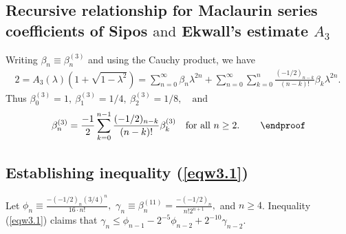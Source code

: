 \documentclass[final,oneeqnum]{siamltex}
\begin{document}
\subsection{Recursive relationship for  Maclaurin series
coefficients of Sipos $\mbox{and}$ Ekwall's estimate \protect\boldmath$A_{3}$}
Writing $\beta_{n}\equiv \beta^{(3)}_{n} $ and using the Cauchy product, we
have
\begin{eqnarray}
2=A_{3}(\lambda)(1+\sqrt{1-\lambda^2})=\sum_{n=0}^{\infty}\beta_{n}\lambda^{
2n} +
\sum_{n=0}^{\infty}\sum_{k=0}^{n}\frac{(-1/2)_{n-k}}{(n-k)!}\beta_{k}\lambda
^{2n}.\ \nonumber
\end{eqnarray} 
Thus $\beta^{(3)}_{0}=1, \ \beta^{(3)}_{1}=1/4, \
\beta^{(3)}_{2}=1/8, \quad \mbox{and} $
\begin{eqnarray}
\beta^{(3)}_{n} =
\frac{-1}{2}\sum_{k=0}^{n-1}\frac{(-1/2)_{n-k}}{(n-k)!}\beta^{(3)}_{k}
\quad
 \mbox{for all } n\geq 2.\, \nonumber \qquad\endproof%
\end{eqnarray}

\subsection{Establishing inequality (\ref{eqw3.1})} Let
$\phi_{n} \equiv  \frac{-(-1/2)_{n}(3/4)^n}{16\cdot n!},$
$\gamma_{n} \equiv  \beta^{(11)}_{n} =
\frac{-(-1/2)_{n}}{n!2^{n+1}},$ and  $n\geq 4$.
Inequality (\ref{eqw3.1}) claims that $\displaystyle
\gamma_{n}\leq \phi_{n-1} - 2^{-5}\phi_{n-2} + 2^{-10}\gamma_{n-2}$.
\end{document}
